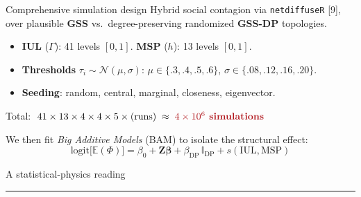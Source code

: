 \documentclass[aspectratio=169,11pt]{beamer}
\newcommand{\refn}[1]{{\color{ndgreen}[#1]}}
\newcommand{\emphr}[1]{{\color{ndreddark}\textbf{#1}}}
\newcommand{\sectionslide}[1]{%
  \begin{frame}[plain]
    \vfill
    \begin{center}
      {\Large #1}\\[2pt]
      {\color{ndred}\rule{0.30\textwidth}{1.1pt}}
    \end{center}
    \vfill
  \end{frame}}
\begin{document}
\begin{frame}{Comprehensive simulation design}
Hybrid social contagion via \texttt{netdiffuseR} \refn{9}, over plausible \emphr{GSS} vs.\
degree-preserving randomized \emphr{GSS-DP} topologies.
\vspace{0.2cm}
\begin{itemize}
  \item \textbf{IUL} ($\Gamma$): 41 levels $[0,1]$. \quad \textbf{MSP} ($h$): 13 levels $[0,1]$.
  \item \textbf{Thresholds} $\tau_i\sim\mathcal{N}(\mu,\sigma)$: $\mu\in\{.3,.4,.5,.6\}$, $\sigma\in\{.08,.12,.16,.20\}$.
  \item \textbf{Seeding}: random, central, marginal, closeness, eigenvector.
\end{itemize}
\vspace{0.2cm}
\begin{center}
Total: $\;41\times13\times4\times4\times5\times \text{(runs)} \;\approx\; \emphr{$4\times10^{6}$ simulations}$
\end{center}
\vspace{0.2cm}
We then fit \emph{Big Additive Models} (BAM) to isolate the structural effect:
\begin{equation*}
  \mathrm{logit}\big[\mathbb{E}(\Phi)\big]=\beta_0+\mathbf{Z}\boldsymbol\beta
  +\beta_{\text{DP}}\,\mathbb{I}_{\text{DP}}+s(\mathrm{IUL},\mathrm{MSP})
\end{equation*}
\end{frame}

\sectionslide{A statistical-physics reading}
\end{document}
